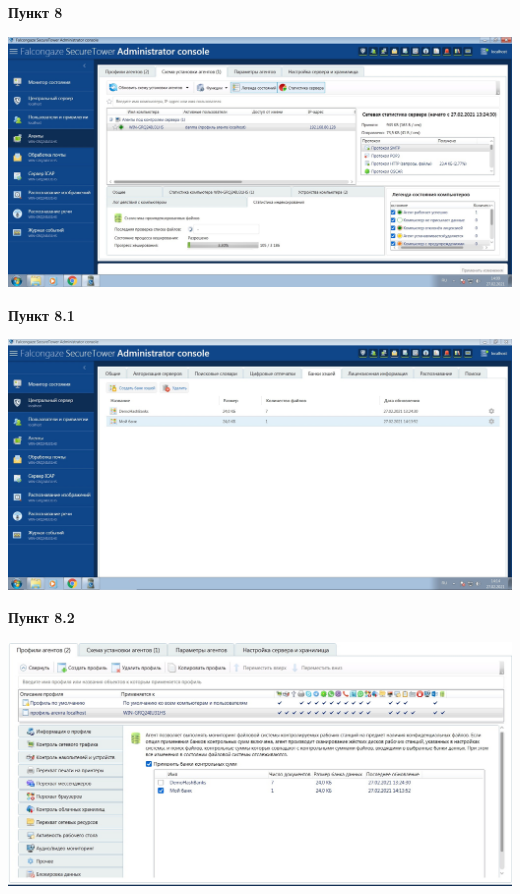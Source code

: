 \documentclass[a4paper,14pt]{extarticle}
\begin{document}
    \newpage
    \textbf{Пункт 8} \\
    \begin{center}
        \includegraphics[scale=0.25]{pics/8.jpg}
    \end{center}

    \textbf{Пункт 8.1} \\
    \begin{center}
        \includegraphics[scale=0.25]{pics/8_1.jpg}
    \end{center}

    \newpage
    \textbf{Пункт 8.2} \\
    \begin{center}
        \includegraphics[scale=0.25]{pics/8_2.jpg}
    \end{center}
\end{document}
